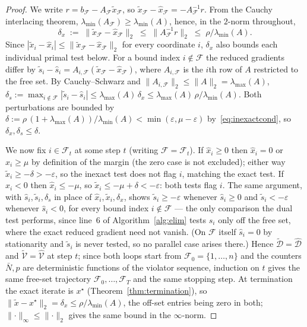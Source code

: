 \documentclass[10pt,a4paper]{amsart}
\begin{document}
\begin{proof}
We write $r = b_{\mathcal{F}} - A_{\mathcal{F}}\tilde x_{\mathcal{F}}$, so
$\tilde x_{\mathcal{F}} - \hat x_{\mathcal{F}} = -A_{\mathcal{F}}^{-1} r$. From the Cauchy
interlacing theorem, $\lambda_{\min}(A_{\mathcal{F}}) \ge \lambda_{\min}(A)$, hence, in the
$2$-norm throughout,
\[
  \delta_x \;:=\; \lVert \tilde x_{\mathcal{F}} - \hat x_{\mathcal{F}} \rVert_2
  \;\le\; \lVert A_{\mathcal{F}}^{-1} r \rVert_2
  \;\le\; \rho/\lambda_{\min}(A).
\]
Since $|\tilde x_i - \hat x_i| \le \lVert \tilde x_{\mathcal{F}} - \hat x_{\mathcal{F}}
\rVert_2$ for every coordinate $i$, $\delta_x$ also bounds each individual primal test below.
For a bound index $i \notin \mathcal{F}$ the reduced gradients differ by
$\tilde s_i - \hat s_i = A_{i,\mathcal{F}}(\tilde x_{\mathcal{F}} - \hat x_{\mathcal{F}})$,
where $A_{i,\mathcal{F}}$ is the $i$th row of $A$ restricted to the free set. By
Cauchy--Schwarz and $\lVert A_{i,\mathcal{F}} \rVert_2 \le \lVert A \rVert_2 =
\lambda_{\max}(A)$, $\delta_s := \max_{i \notin \mathcal{F}} |\tilde s_i - \hat s_i| \le
\lambda_{\max}(A)\,\delta_x \le \lambda_{\max}(A)\,\rho/\lambda_{\min}(A)$. Both
perturbations are bounded by
$\delta := \rho\,(1+\lambda_{\max}(A))/\lambda_{\min}(A) < \min(\varepsilon, \mu-\varepsilon)$
by~\eqref{eq:inexactcond}, so $\delta_x, \delta_s \le \delta$.

We now fix $i \in \mathcal{F}_t$ at some step $t$ (writing $\mathcal{F} = \mathcal{F}_t$). If
$\hat x_i \ge 0$ then $\hat x_i = 0$ or $\hat x_i \ge \mu$ by definition of the margin (the
zero case is not excluded); either way $\tilde x_i \ge
-\delta > -\varepsilon$, so the inexact test does not flag $i$, matching the exact test. If
$\hat x_i < 0$ then $\hat x_i \le -\mu$, so $\tilde x_i \le -\mu + \delta < -\varepsilon$: both
tests flag $i$. The same argument, with $\hat s_i, \tilde s_i, \delta_s$ in place of
$\hat x_i, \tilde x_i, \delta_x$, shows $\tilde s_i \ge -\varepsilon$ whenever $\hat s_i \ge 0$
and $\tilde s_i < -\varepsilon$ whenever $\hat s_i < 0$, for every bound index $i \notin
\mathcal{F}$ --- the only comparison the dual test performs, since line~6 of
Algorithm~\ref{alg:elim} tests $s_i$ only off the free set, where the exact reduced gradient
need not vanish. (On $\mathcal{F}$ itself $\hat s_i = 0$ by stationarity and $\tilde s_i$ is
never tested, so no parallel case arises there.) Hence $\tilde{\mathcal{D}} =
\hat{\mathcal{D}}$ and $\tilde{\mathcal{V}} = \hat{\mathcal{V}}$ at step $t$; since both loops
start from $\mathcal{F}_0 = \{1,\dots,n\}$ and the counters $\bar N, p$ are deterministic
functions of the violator sequence, induction on $t$ gives the same free-set trajectory
$\mathcal{F}_0,\dots,\mathcal{F}_T$ and the same stopping step. At termination the exact
iterate is $x^\star$ (Theorem~\ref{thm:termination}), so
$\lVert \tilde x - x^\star \rVert_2 = \delta_x \le \rho/\lambda_{\min}(A)$, the off-set
entries being zero in both; $\lVert\cdot\rVert_\infty \le \lVert\cdot\rVert_2$ gives the same
bound in the $\infty$-norm.
\end{proof}
\end{document}

